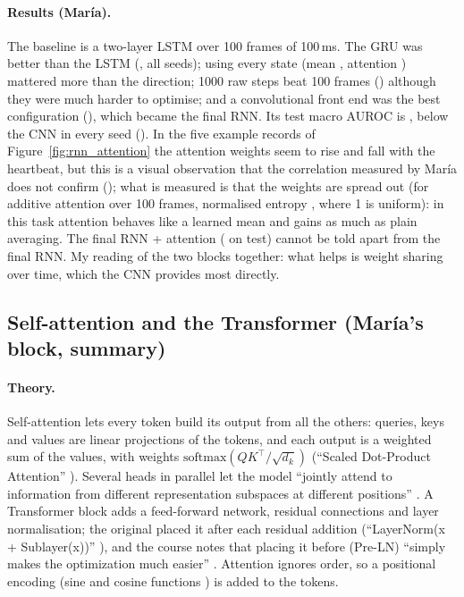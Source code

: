 \paragraph{Results (Mar\'ia).} The baseline is a two-layer LSTM over 100 frames of 100\,ms. The GRU
was better than the LSTM (\rnnDiffMeanGru{}, all seeds); using every state (mean
\rnnDiffMeanMean{}, attention \rnnDiffMeanAttn{}) mattered more than the direction;
1000 raw steps beat 100 frames (\rnnDiffMeanRaw{}) although they were much harder to optimise; and a
convolutional front end was the best configuration (\rnnDiffMeanConv{}), which became the final RNN.
Its test macro AUROC is \rnnFinalTestMacroAurocMean{}, below the CNN in every seed
(\rnnDiffCnnMean{}). In the five example records of Figure~\ref{fig:rnn_attention} the attention weights seem to rise and
fall with the heartbeat, but this is a visual observation that the correlation measured by Mar\'ia does
not confirm (\rnnAttnSpearmanActivityRawAttn{}); what is measured is that the weights are spread out (for additive attention over 100 frames, normalised
entropy \rnnAttnEntropyNormAttn{}, where 1 is uniform): in this task attention behaves like a learned mean and gains as much as plain
averaging. The final RNN + attention (\rnnAttnfinalTestMacroAurocMean{} on test) cannot be told apart
from the final RNN. My reading of the two blocks together: what helps is weight sharing over time,
which the CNN provides most directly.



\subsection{Self-attention and the Transformer (Mar\'ia's block, summary)}\label{sec:transformer}

\paragraph{Theory.} Self-attention lets every token build its output from all the others: queries,
keys and values are linear projections of the tokens, and each output is a weighted sum of the
values, with weights $\mathrm{softmax}(QK^\top/\sqrt{d_k})$ (``Scaled Dot-Product Attention''
\cite[p.~4]{vaswani2017attention}). Several heads in parallel let the model ``jointly attend to
information from different representation subspaces at different positions''
\cite[p.~5]{vaswani2017attention}. A Transformer block adds a feed-forward network, residual
connections and layer normalisation; the original placed it after each residual addition
(``LayerNorm(x + Sublayer(x))'' \cite[p.~3]{vaswani2017attention}), and the course notes that
placing it before (Pre-LN) ``simply makes the optimization much easier''
\cite{course_transformer_part2}. Attention ignores order, so a positional encoding (sine and cosine
functions \cite[p.~6]{vaswani2017attention}) is added to the tokens.

